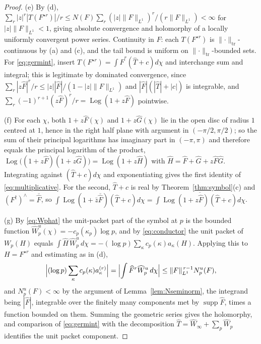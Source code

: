 \documentclass[11pt]{amsart}
\theoremstyle{definition}
\theoremstyle{remark}
\newcommand{\supp}{\operatorname{supp}}
\newcommand{\Th}{\widehat{T}}
\newcommand{\Wh}{\widehat{W}}
\newcommand{\Log}{\operatorname{Log}}
\begin{document}
\begin{proof}
(e)  By (d),
$\sum_r|z|^{r}|T(F^{\star r})|/r\le N(F)\sum_r(|z|\lVert F\rVert_{L^1})^{r}/
(r\lVert F\rVert_{L^1})<\infty$ for $|z|\lVert F\rVert_{L^1}<1$, giving
absolute convergence and holomorphy of a locally uniformly convergent power
series.  Continuity in $F$: each $T(F^{\star r})$ is
$\lVert\cdot\rVert_{\mathrm{tr}}$-continuous by (a) and (c), and the tail bound
is uniform on $\lVert\cdot\rVert_{\mathrm{tr}}$-bounded sets.  For
\eqref{eq:germint}, insert $T(F^{\star r})=\int\widehat F^{r}(\Th+c)d\chi$ and
interchange sum and integral; this is legitimate by dominated convergence,
since $\sum_r|z\widehat F|^{r}/r\le|z||\widehat F|/(1-|z|\lVert
F\rVert_{L^1})$ and $|\widehat F|(|\Th|+|c|)$ is integrable, and
$\sum_r(-1)^{r+1}(z\widehat F)^{r}/r=\Log(1+z\widehat F)$ pointwise.

(f)  For each $\chi$, both $1+z\widehat F(\chi)$ and $1+z\widehat G(\chi)$ lie
in the open disc of radius $1$ centred at $1$, hence in the right half plane
with argument in $(-\pi/2,\pi/2)$; so the sum of their principal logarithms has
imaginary part in $(-\pi,\pi)$ and therefore equals the principal logarithm of
the product, $\Log\bigl((1+z\widehat F)(1+z\widehat G)\bigr)=\Log(1+z\widehat
H)$ with $\widehat H=\widehat F+\widehat G+z\widehat F\widehat G$.  Integrating
against $(\Th+c)d\chi$ and exponentiating gives the first identity of
\eqref{eq:multiplicative}.  For the second, $\Th+c$ is real by
Theorem~\ref{thm:symbol}(c) and $(F^{\dagger})^{\wedge}=\overline{\widehat F}$,
so $\int\Log(1+\bar z\overline{\widehat F})(\Th+c)d\chi=
\overline{\int\Log(1+z\widehat F)(\Th+c)d\chi}$.

(g)  By \eqref{eq:Wphat} the unit-packet part of the symbol at $p$ is the
bounded function $\widehat W^{u}_p(\chi)=-c_p(\kappa_p)\log p$, and by
\eqref{eq:conductor} the unit packet of $W_p(H)$ equals
$\int\widehat H\,\widehat W^{u}_p\,d\chi=-(\log p)\sum_{\kappa}
c_p(\kappa)a_{\kappa}(H)$.  Applying this to $H=F^{\star r}$ and estimating as
in (d),
\[
\Bigl|(\log p)\sum_{\kappa}c_p(\kappa)a^{(r)}_{\kappa}\Bigr|
=\Bigl|\int\widehat F^{r}\widehat W^{u}_p\,d\chi\Bigr|
\le\lVert F\rVert_{L^{1}}^{\,r-1}N^{u}_p(F),
\]
and $N^{u}_p(F)<\infty$ by the argument of Lemma~\ref{lem:Nseminorm}, the
integrand being $|\widehat F|$, integrable over the finitely many components
met by $\supp\widehat F$, times a function bounded on them.  Summing the
geometric series gives the holomorphy, and comparison of \eqref{eq:germint}
with the decomposition $\Th=\Wh_{\infty}+\sum_p\Wh_p$ identifies the unit
packet component.
\end{proof}
\end{document}
